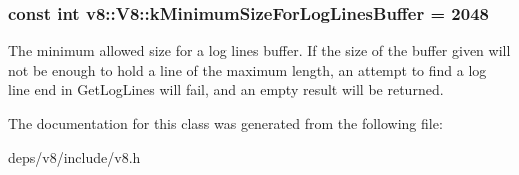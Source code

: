 \subsubsection[{k\+Minimum\+Size\+For\+Log\+Lines\+Buffer}]{\setlength{\rightskip}{0pt plus 5cm}const int v8\+::\+V8\+::k\+Minimum\+Size\+For\+Log\+Lines\+Buffer = 2048\hspace{0.3cm}{\ttfamily [static]}}\label{classv8_1_1_v8_a2bdde078c68d2820262925687b962553}
The minimum allowed size for a log lines buffer. If the size of the buffer given will not be enough to hold a line of the maximum length, an attempt to find a log line end in Get\+Log\+Lines will fail, and an empty result will be returned. 

The documentation for this class was generated from the following file\+:\begin{DoxyCompactItemize}
\item 
deps/v8/include/v8.\+h\end{DoxyCompactItemize}
